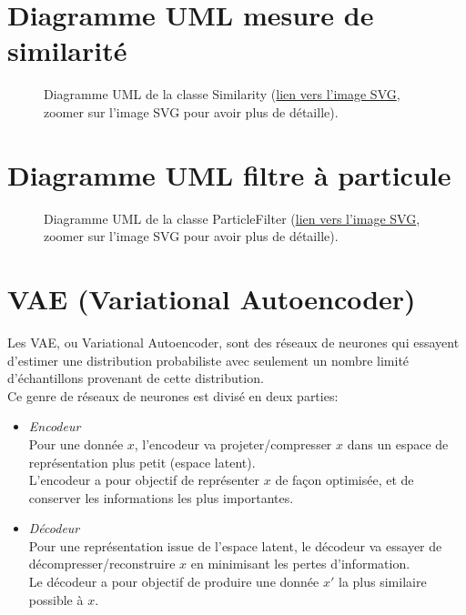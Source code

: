 \begin{appendices}
\clearpage
\section*{Diagramme UML mesure de similarité}\label{app:UMLSimilarity}
\begin{figure}[!htbp]
	\center
	\caption{Diagramme UML de la classe Similarity (\href{https://raw.githubusercontent.com/gabriel-combe/Cuttlefish_Tracker/main/rapport/UML/similarity.svg}{lien vers l'image SVG}, zoomer sur l'image SVG pour avoir plus de détaille).}
	\label{fig:uml_diagram_similarity}
\end{figure}
\FloatBarrier


\clearpage
\section*{Diagramme UML filtre à particule}\label{app:UMLParticleFilter}
\begin{figure}[!htbp]
	\center
	\caption{Diagramme UML de la classe ParticleFilter (\href{https://raw.githubusercontent.com/gabriel-combe/Cuttlefish_Tracker/main/rapport/UML/particlefilter.svg}{lien vers l'image SVG}, zoomer sur l'image SVG pour avoir plus de détaille).}
	\label{fig:uml_diagram_particlefilter}
\end{figure}
\FloatBarrier
	
	
\clearpage
\section*{VAE (Variational Autoencoder)}\label{app:variational_autoencoder}
Les VAE, ou Variational Autoencoder, sont des réseaux de neurones qui essayent d'estimer une distribution probabiliste avec seulement un nombre limité d'échantillons provenant de cette distribution.\\
Ce genre de réseaux de neurones est divisé en deux parties:\\
\begin{itemize}
	\item \emph{Encodeur}\\
	Pour une donnée $x$, l'encodeur va projeter/compresser $x$ dans un espace de représentation plus petit (espace latent).\\
	L'encodeur a pour objectif de représenter $x$ de façon optimisée, et de conserver les informations les plus importantes.\\
	\item \emph{Décodeur}\\
	Pour une représentation issue de l'espace latent, le décodeur va essayer de décompresser/reconstruire $x$ en minimisant les pertes d'information.\\
	Le décodeur a pour objectif de produire une donnée $x'$ la plus similaire possible à $x$.\\
\end{itemize}
	

\end{appendices}
